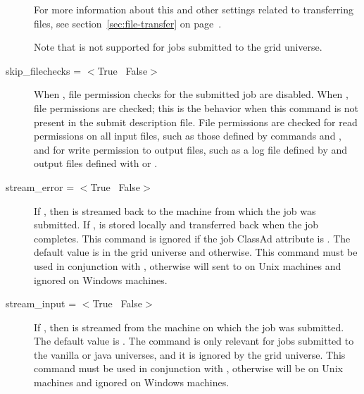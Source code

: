 \begin{description}
For more information about this and other settings related to
transferring files, see section~\ref{sec:file-transfer} on
page~\pageref{sec:file-transfer}.

Note that  is not supported
for jobs submitted to the grid universe.

\label{man-condor-submit-skip-filechecks}
\item[skip\_filechecks = $<$True \Bar\ False$>$]
When ,
file permission checks for the submitted job are disabled.
When , file permissions are checked; this is the behavior
when this command is not present in the submit description file.
File permissions are checked for read permissions on all input files,
such as those defined by 
commands  and ,
and for write permission to output files, 
such as a log file defined by  and output files defined with
 or .

\label{man-condor-submit-stream-error}
\item[stream\_error = $<$True \Bar\ False$>$]
If , then  is streamed back to
the machine from which the job was submitted.
If ,  is stored locally
and transferred back when the job completes.
This command is ignored if the job ClassAd attribute
 is
.
The default value is  in the grid
universe and  otherwise.
This command must be used in conjunction with 
, otherwise  will
sent to  on Unix machines and
ignored on Windows machines.

\label{man-condor-submit-stream-input}
\item[stream\_input = $<$True \Bar\ False$>$]
If , then  is streamed from the
machine on which the job was submitted.
The default value is .
The command is only relevant for jobs submitted to
the vanilla or java universes, and
it is ignored by the grid
universe.
This command must be used in conjunction with 
, otherwise  will
be  on Unix machines and
ignored on Windows machines.


\end{description}
